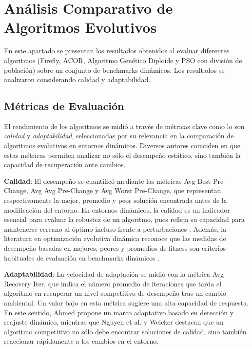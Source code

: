 \documentclass[10pt]{article}
\begin{document}
\section*{Análisis Comparativo de Algoritmos Evolutivos}

En este apartado se presentan los resultados obtenidos al evaluar diferentes algoritmos (Firefly, ACOR, Algoritmo Genético Diploide y PSO con división de población) sobre un conjunto de benchmarks dinámicos. Los resultados se analizaron considerando calidad y adaptabilidad.

\subsection*{Métricas de Evaluación}

El rendimiento de los algoritmos se midió a través de métricas clave como lo son \emph{calidad} y \emph{adaptabilidad}, seleccionadas por su relevancia en la comparación de algoritmos evolutivos en entornos dinámicos. Diversos autores coinciden en que estas métricas permiten analizar no sólo el desempeño estático, sino también la capacidad de recuperación ante cambios.

\textbf{Calidad}: El desempeño se cuantificó mediante las métricas Avg Best Pre-Change, Avg Avg Pre-Change y Avg Worst Pre-Change, que representan respectivamente la mejor, promedio y peor solución encontrada antes de la modificación del entorno. En entornos dinámicos, la calidad es un indicador esencial para evaluar la robustez de un algoritmo, pues refleja su capacidad para mantenerse cercano al óptimo incluso frente a perturbaciones \cite{ahmed2024adaptive}. Además, la literatura en optimización evolutiva dinámica reconoce que las medidas de desempeño basadas en mejores, peores y promedios de fitness son criterios habituales de evaluación en benchmarks dinámicos \cite{nguyen2012survey,weicker2003performance}.

\textbf{Adaptabilidad}: La velocidad de adaptación se midió con la métrica Avg Recovery Iter, que indica el número promedio de iteraciones que tarda el algoritmo en recuperar un nivel competitivo de desempeño tras un cambio ambiental. Un valor bajo en esta métrica sugiere una alta capacidad de respuesta. En este sentido, Ahmed \cite{ahmed2024adaptive} propone un marco adaptativo basado en detección y reajuste dinámico, mientras que Nguyen et al. \cite{nguyen2013kd} y Weicker \cite{weicker2003performance} destacan que un algoritmo competitivo no sólo debe encontrar soluciones de calidad, sino también reaccionar rápidamente a los cambios en el entorno.
\end{document}
